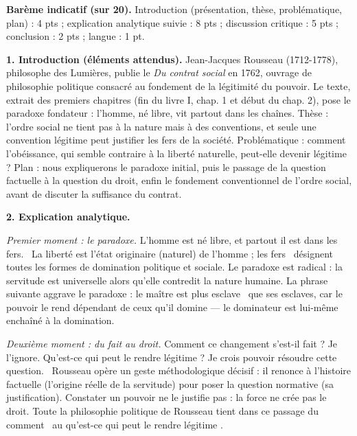 \documentclass[11pt]{article}
\begin{document}
\begin{corrige}

\textbf{Barème indicatif (sur 20).} Introduction (présentation, thèse, problématique, plan) : 4 pts ; explication analytique suivie : 8 pts ; discussion critique : 5 pts ; conclusion : 2 pts ; langue : 1 pt.

\textbf{1. Introduction (éléments attendus).} Jean-Jacques Rousseau (1712-1778), philosophe des Lumières, publie le \emph{Du contrat social} en 1762, ouvrage de philosophie politique consacré au fondement de la légitimité du pouvoir. Le texte, extrait des premiers chapitres (fin du livre I, chap. 1 et début du chap. 2), pose le paradoxe fondateur : l'homme, né libre, vit partout dans les chaînes. Thèse : l'ordre social ne tient pas à la nature mais à des conventions, et seule une convention légitime peut justifier les fers de la société. Problématique : comment l'obéissance, qui semble contraire à la liberté naturelle, peut-elle devenir légitime ? Plan : nous expliquerons le paradoxe initial, puis le passage de la question factuelle à la question du droit, enfin le fondement conventionnel de l'ordre social, avant de discuter la suffisance du contrat.

\textbf{2. Explication analytique.}

\emph{Premier moment : le paradoxe.} \guillemotleft L'homme est né libre, et partout il est dans les fers. \guillemotright\ La liberté est l'état originaire (naturel) de l'homme ; les \guillemotleft fers \guillemotright\ désignent toutes les formes de domination politique et sociale. Le paradoxe est radical : la servitude est universelle alors qu'elle contredit la nature humaine. La phrase suivante aggrave le paradoxe : le maître est \guillemotleft plus esclave \guillemotright\ que ses esclaves, car le pouvoir le rend dépendant de ceux qu'il domine — le dominateur est lui-même enchaîné à la domination.

\emph{Deuxième moment : du fait au droit.} \guillemotleft Comment ce changement s'est-il fait ? Je l'ignore. Qu'est-ce qui peut le rendre légitime ? Je crois pouvoir résoudre cette question. \guillemotright\ Rousseau opère un geste méthodologique décisif : il renonce à l'histoire factuelle (l'origine réelle de la servitude) pour poser la question normative (sa justification). Constater un pouvoir ne le justifie pas : la force ne crée pas le droit. Toute la philosophie politique de Rousseau tient dans ce passage du \guillemotleft comment \guillemotright\ au \guillemotleft qu'est-ce qui peut le rendre légitime \guillemotright.


\end{corrige}
\end{document}
